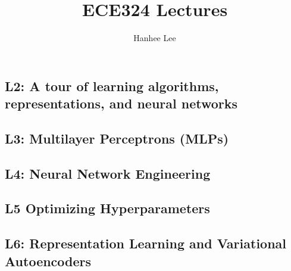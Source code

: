 \documentclass{article}
\title{ECE324 Lectures}
\author{Hanhee Lee}
\begin{document}
\begin{center}
    \section*{L2: A tour of learning algorithms, representations, and neural networks}
\end{center}

\newpage

\begin{center}
    \section*{L3: Multilayer Perceptrons (MLPs)}
\end{center}

\newpage

\begin{center}
    \section*{L4: Neural Network Engineering}
\end{center}

\newpage

\begin{center}
    \section*{L5 Optimizing Hyperparameters}
\end{center}

\newpage

\begin{center}
    \section*{L6: Representation Learning and Variational Autoencoders}
\end{center}

\newpage
\end{document}
